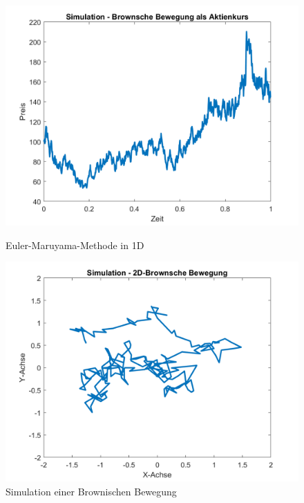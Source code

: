 \begin{figure}[h!]
	\centering
	\begin{minipage}{0.45\textwidth}
		\centering
		\includegraphics[width=\linewidth]{papers/brown/images/Aktienkurs-als-Brownische-Bewegung_2.png}
		\caption{Euler-Maruyama-Methode in 1D}
	\end{minipage}
	\hspace{0.05\linewidth}
	\begin{minipage}{0.45\textwidth}
		\centering
		\includegraphics[width=\linewidth]{papers/brown/images/Brownische-Bewegung-Simuliert_2.png}
		\caption{Simulation einer Brownischen Bewegung}
	\end{minipage}
\end{figure}

